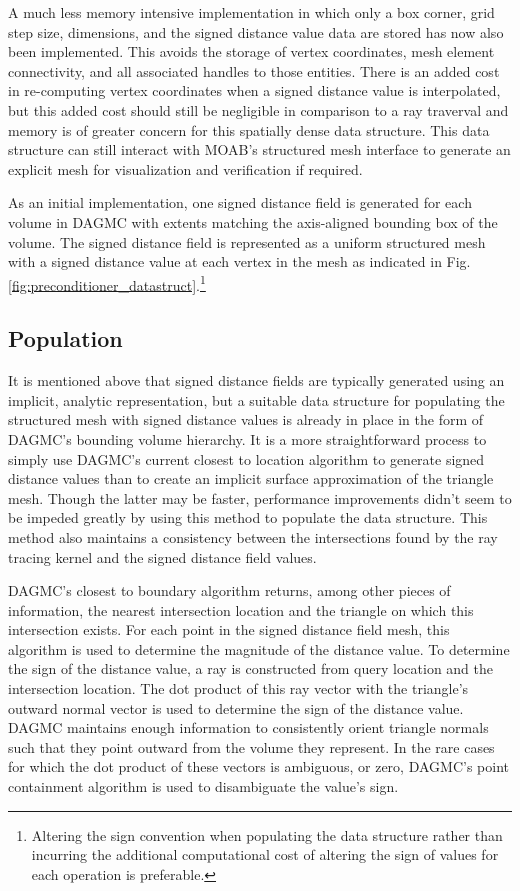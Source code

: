 A much less memory intensive implementation in which only a box
corner, grid step size, dimensions, and the signed distance value data are
stored has now also been implemented. This avoids the storage of vertex
coordinates, mesh element connectivity, and all associated handles to those
entities. There is an added cost in re-computing vertex coordinates when a
signed distance value is interpolated, but this added cost should still be
negligible in comparison to a ray traverval and memory is of greater concern for
this spatially dense data structure. This data structure can still interact with
MOAB's structured mesh interface to generate an explicit mesh for visualization
and verification if required.

As an initial implementation, one signed distance field is generated for each
volume in DAGMC with extents matching the axis-aligned bounding box of the
volume. The signed distance field is represented as a uniform structured mesh
with a signed distance value at each vertex in the mesh as indicated in Fig.
\ref{fig:preconditioner_datastruct}.\footnote{Altering the sign convention when
  populating the data structure rather than incurring the additional
  computational cost of altering the sign of values for each operation is
  preferable.}

\subsection{Population}

It is mentioned above that signed distance fields are typically
generated using an implicit, analytic representation, but a suitable data
structure for populating the structured mesh with signed distance values is
already in place in the form of DAGMC's bounding volume hierarchy. It is a more
straightforward process to simply use DAGMC's current closest to location
algorithm to generate signed distance values than to create an implicit surface
approximation of the triangle mesh. Though the latter may be faster,
performance improvements didn't seem to be impeded greatly by using this method
to populate the data structure. This method also maintains a consistency between
the intersections found by the ray tracing kernel and the signed distance field
values.

DAGMC's closest to boundary algorithm returns, among other pieces of
information, the nearest intersection location and the triangle on which this
intersection exists. For each point in the signed distance field mesh, this
algorithm is used to determine the magnitude of the distance value. To determine
the sign of the distance value, a ray is constructed from query location and the
intersection location. The dot product of this ray vector with the triangle's
outward normal vector is used to determine the sign of the distance value. DAGMC
maintains enough information to consistently orient triangle normals such that
they point outward from the volume they represent. In the rare cases for which
the dot product of these vectors is ambiguous, or zero, DAGMC's point
containment algorithm is used to disambiguate the value's sign.

